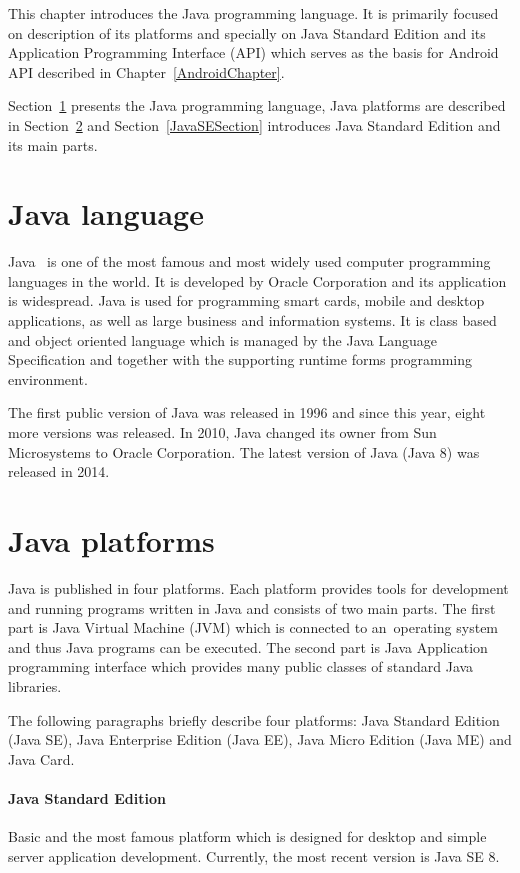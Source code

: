 This chapter introduces the Java programming language. It is primarily focused on description of its platforms and
specially on Java Standard Edition and its Application Programming Interface (API) which serves as the basis for Android
API described in Chapter~\ref{AndroidChapter}.

Section~\ref{JavaLangSection} presents the Java programming language, Java platforms are described in
Section~\ref{JavaPlatformsSection} and Section~\ref{JavaSESection} introduces Java Standard Edition and its main parts.

\section{Java language}\label{JavaLangSection}
Java~\cite{JavaBook, Java6Doc} is one of the most famous and most widely used computer programming languages in the
world. It is developed by Oracle Corporation and its application is widespread. Java is used for programming smart
cards, mobile and desktop applications, as well as large business and information systems. It is class based and object
oriented language which is managed by the Java Language Specification and together with the supporting runtime forms
programming environment.

The first public version of Java was released in 1996 and since this year, eight more versions was released. In 2010,
Java changed its owner from Sun Microsystems to Oracle Corporation. The latest version of Java (Java 8) was released in
2014.

\section{Java platforms}\label{JavaPlatformsSection}
Java is published in four platforms. Each platform provides tools for development and running programs written in Java
and consists of two main parts. The first part is Java Virtual Machine (JVM) which is connected to an~operating system
and thus Java programs can be executed. The second part is Java Application programming interface which provides many
public classes of standard Java libraries.

The following paragraphs briefly describe four platforms: Java Standard Edition (Java SE), Java Enterprise Edition
(Java EE), Java Micro Edition (Java ME) and Java Card.

\paragraph{Java Standard Edition}
Basic and the most famous platform which is designed for desktop and simple server application development. Currently,
the most recent version is Java SE 8.

